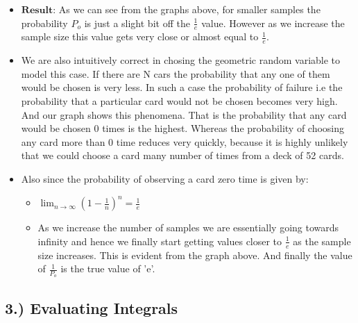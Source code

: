 \documentclass[11pt]{article}
\begin{document}
    \begin{itemize}
\item
  \(\textbf{Result}\): As we can see from the graphs above, for smaller
  samples the probability \(P_o\) is just a slight bit off the
  \(\frac{1}{e}\) value. However as we increase the sample size this
  value gets very close or almost equal to \(\frac{1}{e}\).
\item
  We are also intuitively correct in chosing the geometric random
  variable to model this case. If there are N cars the probability that
  any one of them would be chosen is very less. In such a case the
  probability of failure i.e the probability that a particular card
  would not be chosen becomes very high. And our graph shows this
  phenomena. That is the probability that any card would be chosen 0
  times is the highest. Whereas the probability of choosing any card
  more than 0 time reduces very quickly, because it is highly unlikely
  that we could choose a card many number of times from a deck of 52
  cards.
\item
  Also since the probability of observing a card zero time is given by:

  \begin{itemize}
  \item
    \(\lim_{n\to\infty} (1-\frac{1}{n})^n = \frac{1}{e}\)
  \item
    As we increase the number of samples we are essentially going
    towards infinity and hence we finally start getting values closer to
    \(\frac{1}{e}\) as the sample size increases. This is evident from
    the graph above. And finally the value of \(\frac{1}{P_o}\) is the
    true value of 'e'.
  \end{itemize}
\end{itemize}

    \subsection{3.) Evaluating Integrals}\label{evaluating-integrals}
\end{document}
